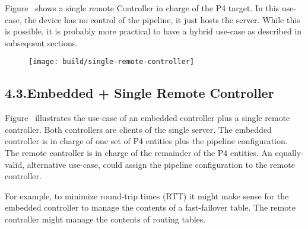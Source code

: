 \documentclass[11pt]{article}
\begin{document}
{%
\noindent{}Figure~ shows a single remote Controller in
charge of the P4 target. In this use-case, the device has no control of the
pipeline, it just hosts the server. While this is possible, it is probably more
practical to have a hybrid use-case as described in subsequent sections.%

\begin{figure}[tbp]%
\begin{mdcenter}%

\noindent{}\texttt{[image: build/single-remote-controller]}{}%

\mdhr{}%

\noindent{}%
\end{mdcenter}\label{fig-single-remote-controller}%
\end{figure}%

\subsection{4.3.\hspace*{0.5em}Embedded + Single Remote Controller}\label{sec-embedded-single-remote-controller}%

\noindent{}Figure~ illustrates the use-case of
an embedded controller plus a single remote controller. Both controllers are
clients of the single server. The embedded controller is in charge of one set of
P4 entities plus the pipeline configuration. The remote controller is in charge
of the remainder of the P4 entities. An equally-valid, alternative use-case,
could assign the pipeline configuration to the remote controller.%

For example, to minimize round-trip times (RTT) it might make sense for the
embedded controller to manage the contents of a fast-failover table. The remote
controller might manage the contents of routing tables.%

\begin{figure}[tbp]%
\begin{mdcenter}%


\end{mdcenter}
\end{figure}}
\end{document}
